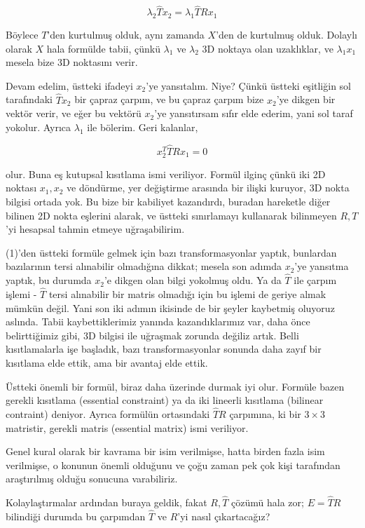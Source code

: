 \documentclass[12pt,fleqn]{article}\usepackage{../../common}
\begin{document}
$$ \lambda_2 \hat{T} x_2 = \lambda_1 \hat{T} R x_1  $$

Böylece $T$'den kurtulmuş olduk, aynı zamanda $X$'den de kurtulmuş
olduk. Dolaylı olarak $X$ hala formülde tabii, çünkü $\lambda_1$ ve $\lambda_2$
3D noktaya olan uzaklıklar, ve $\lambda_1 x_1$ mesela bize 3D noktasını verir.

Devam edelim, üstteki ifadeyi $x_2$'ye yansıtalım. Niye? Çünkü üstteki eşitliğin
sol tarafındaki $\hat{T}x_2$ bir çapraz çarpım, ve bu çapraz çarpım bize
$x_2$'ye dikgen bir vektör verir, ve eğer bu vektörü $x_2$'ye yansıtırsam sıfır
elde ederim, yani sol taraf yokolur. Ayrıca $\lambda_1$ ile bölerim. Geri
kalanlar,

$$ x_2^T \hat{T} R x_1 = 0 $$

olur. Buna eş kutupsal kısıtlama ismi veriliyor. Formül ilginç çünkü iki 2D
noktası $x_1,x_2$ ve döndürme, yer değiştirme arasında bir ilişki kuruyor, 3D
nokta bilgisi ortada yok. Bu bize bir kabiliyet kazandırdı, buradan hareketle
diğer bilinen 2D nokta eşlerini alarak, ve üstteki sınırlamayı kullanarak
bilinmeyen $R,T$'yi hesapsal tahmin etmeye uğraşabilirim.

(1)'den üstteki formüle gelmek için bazı transformasyonlar yaptık, bunlardan
bazılarının tersi alınabilir olmadığına dikkat; mesela son adımda $x_2$'ye
yansıtma yaptık, bu durumda $x_2$'e dikgen olan bilgi yokolmuş oldu. Ya da
$\hat{T}$ ile çarpım işlemi - $\hat{T}$ tersi alınabilir bir matris olmadığı
için bu işlemi de geriye almak mümkün değil. Yani son iki adımın ikisinde de bir
şeyler kaybetmiş oluyoruz aslında. Tabii kaybettiklerimiz yanında
kazandıklarımız var, daha önce belirttiğimiz gibi, 3D bilgisi ile uğraşmak
zorunda değiliz artık. Belli kısıtlamalarla işe başladık, bazı transformasyonlar
sonunda daha zayıf bir kısıtlama elde ettik, ama bir avantaj elde ettik.

Üstteki önemli bir formül, biraz daha üzerinde durmak iyi olur. Formüle bazen
gerekli kısıtlama (essential constraint) ya da iki lineerli kısıtlama (bilinear
contraint) deniyor. Ayrıca formülün ortasındaki $\hat{T} R $ çarpımına, ki bir
$3 \times 3$ matristir, gerekli matris (essential matrix) ismi veriliyor.

Genel kural olarak bir kavrama bir isim verilmişse, hatta birden fazla isim
verilmişse, o konunun önemli olduğunu ve çoğu zaman pek çok kişi tarafından
araştırılmış olduğu sonucuna varabiliriz.

Kolaylaştırmalar ardından buraya geldik, fakat $R,\hat{T}$ çözümü hala zor; $E =
\hat{T}R$ bilindiği durumda bu çarpımdan $\hat{T}$ ve $R$'yi nasıl çıkartacağız?
\end{document}
